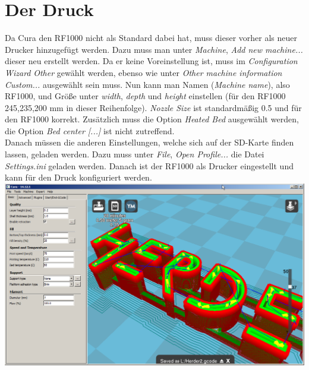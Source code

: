 \documentclass[10pt,a4paper]{scrartcl}
\begin{document}
\section{Der Druck}
Da Cura den RF1000 nicht als Standard dabei hat, muss dieser vorher als neuer Drucker hinzugefügt werden. Dazu muss man unter \textit{Machine}, \textit{Add new machine...} dieser neu erstellt werden. Da er keine Voreinstellung ist, muss im \textit{Configuration Wizard} \textit{Other} gewählt werden, ebenso wie unter \textit{Other machine information} \textit{Custom...} ausgewählt sein muss. Nun kann man Namen (\textit{Machine name}), also RF1000, und Größe unter \textit{width}, \textit{depth} und \textit{height} einstellen (für den RF1000 245,235,200 mm in dieser Reihenfolge). \textit{Nozzle Size} ist standardmäßig 0.5 und für den RF1000 korrekt. Zusätzlich muss die Option \textit{Heated Bed} ausgewählt werden, die Option \textit{Bed center [...]} ist nicht zutreffend.\\
Danach müssen die anderen Einstellungen, welche sich auf der SD-Karte finden lassen, geladen werden. Dazu muss unter \textit{File}, \textit{Open Profile...} die Datei \textit{Settings.ini} geladen werden. Danach ist der RF1000 als Drucker eingestellt und kann für den Druck konfiguriert werden.\\
\includegraphics[scale=0.4]{res/Cura-window.png}\\
\end{document}
